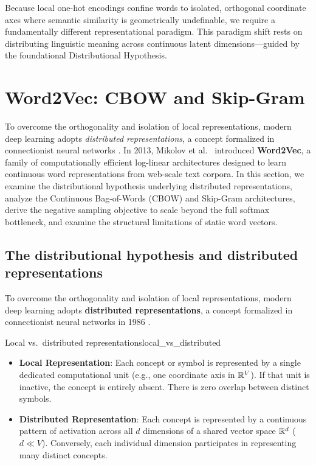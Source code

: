 \documentclass[../../../main.tex]{subfiles}
\begin{document}
Because local one-hot encodings confine words to isolated, orthogonal coordinate axes where semantic similarity is geometrically undefinable, we require a fundamentally different representational paradigm. This paradigm shift rests on distributing linguistic meaning across continuous latent dimensions---guided by the foundational Distributional Hypothesis.

\clearpage

\clearpage
\section{Word2Vec: CBOW and Skip-Gram}
\label{sec:word2vec_cbow_skipgram}

To overcome the orthogonality and isolation of local representations, modern deep learning adopts \textit{distributed representations}, a concept formalized in connectionist neural networks \citep{rumelhart1986}. In 2013, Mikolov et al.~\citep{mikolov2013efficient,mikolov2013distributed} introduced \textbf{Word2Vec}, a family of computationally efficient log-linear architectures designed to learn continuous word representations from web-scale text corpora. In this section, we examine the distributional hypothesis underlying distributed representations, analyze the Continuous Bag-of-Words (CBOW) and Skip-Gram architectures, derive the negative sampling objective to scale beyond the full softmax bottleneck, and examine the structural limitations of static word vectors.

\subsection{The distributional hypothesis and distributed representations}
\label{subsec:distributional_hypothesis}


To overcome the orthogonality and isolation of local representations, modern deep learning adopts \textbf{distributed representations}, a concept formalized in connectionist neural networks in 1986 \cite{rumelhart1986}.

\begin{definition}{Local vs.~distributed representations}{local_vs_distributed}
\begin{itemize}
    \item \textbf{Local Representation}: Each concept or symbol is represented by a single dedicated computational unit (e.g., one coordinate axis in $\mathbb{R}^V$). If that unit is inactive, the concept is entirely absent. There is zero overlap between distinct symbols.
    \item \textbf{Distributed Representation}: Each concept is represented by a continuous pattern of activation across all $d$ dimensions of a shared vector space $\mathbb{R}^d$ ($d \ll V$). Conversely, each individual dimension participates in representing many distinct concepts.
\end{itemize}
\end{definition}
\end{document}
